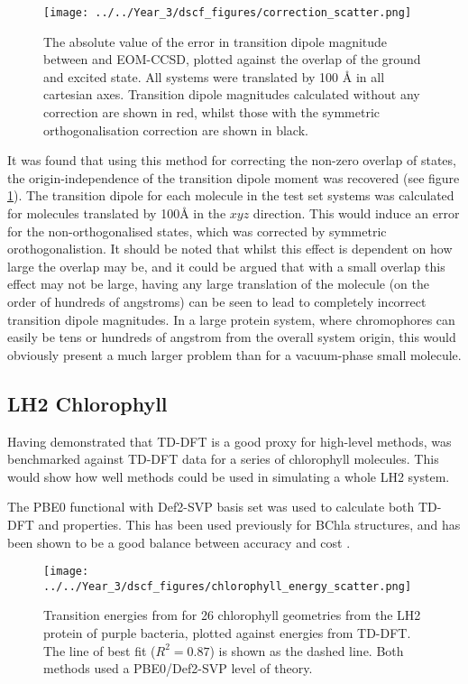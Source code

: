\begin{figure}
\centering
\texttt{[image: ../../Year\_3/dscf\_figures/correction\_scatter.png]}
\label{fig:correction_scatter}
\caption{The absolute value of the error in transition dipole magnitude between
\dscf and EOM-CCSD, plotted against the \dscf overlap of the ground and excited
state. All systems were translated by 100 \AA{} in all cartesian axes. Transition
dipole magnitudes calculated without any correction are shown in red, whilst
those with the symmetric orthogonalisation correction are shown in black.}
\end{figure}

It was found that using this method for correcting the non-zero overlap of states, 
the origin-independence of the transition dipole moment was recovered (see figure
\ref{fig:correction_scatter}).
The transition dipole for each molecule in the test set systems was calculated
for molecules translated by 100\AA{} in the $xyz$ direction.
This would induce an error for the non-orthogonalised states, which was corrected 
by symmetric orothogonalistion. It should be noted that whilst this effect is dependent
on how large the overlap may be, and it could be argued that with a small overlap 
this effect may not be large, having any large translation of the molecule (on the order of hundreds of angstroms) 
can be seen to lead to completely incorrect transition dipole magnitudes. In a
large protein system, where chromophores can easily be tens or hundreds of angstrom
from the overall system origin, this would obviously present a much larger problem 
than for a vacuum-phase small molecule.

\subsection{LH2 Chlorophyll}
\label{subsec:dscf_chl_tests}
Having demonstrated that TD-DFT is a good proxy for high-level methods, \dscf was
benchmarked against TD-DFT data for a series of chlorophyll molecules. This would
show how well \dscf methods could be used in simulating a whole LH2 system.

The PBE0 functional with Def2-SVP basis set \cite{Adamo1999, Schafer1992} was used
to calculate both TD-DFT and \dscf properties. This has been used previously for 
BChla structures, and has been shown to be a good balance between accuracy and cost 
\cite{Stross2016}. 

\begin{figure}
\centering
\texttt{[image: ../../Year\_3/dscf\_figures/chlorophyll\_energy\_scatter.png]}
\label{fig:chl_energy}
\caption{Transition energies from \dscf for 26 chlorophyll geometries from the LH2
protein of purple bacteria,  plotted against energies from TD-DFT. The line of
best fit ($R^2=0.87$) is shown as the dashed line. Both methods used a PBE0/Def2-SVP 
level of theory.}
\end{figure}

